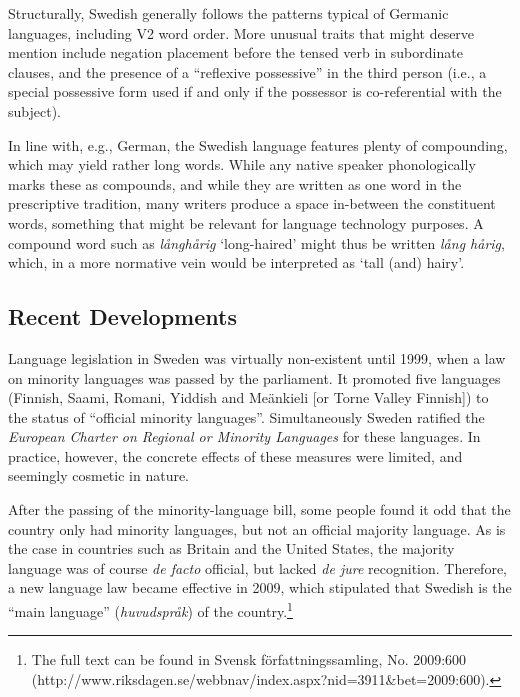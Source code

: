 \begin{multicols}{2}
Structurally, Swedish generally follows the patterns typical of
Germanic languages, including V2 word order. More unusual traits that
might deserve mention include negation placement before the tensed
verb in subordinate clauses, and the presence of a ``reflexive
possessive'' in the third person (i.e., a special possessive form used
if and only if the possessor is co-referential with the subject).


In line with, e.g., German, the Swedish language features plenty of
compounding, which may yield rather long words. While any native
speaker phonologically marks these as compounds, and while they are
written as one word in the prescriptive tradition, many writers
produce a space in-between the constituent words, something that might
be relevant for language technology purposes. A compound word such as
\textit{långhårig} `long-haired' might thus be written \textit{lång
  hårig}, which, in a more normative vein would be interpreted as
`tall (and) hairy'.

\subsection{Recent Developments}

Language legislation in Sweden was virtually non-existent until 1999,
when a law on minority languages was passed by the parliament. It
promoted five languages (Finnish, Saami, Romani, Yiddish and Meänkieli
[or Torne Valley Finnish]) to the status of ``official minority
languages''. Simultaneously Sweden ratified the \textit{European
  Charter on Regional or Minority Languages} for these languages. In
practice, however, the concrete effects of these measures were
limited, and seemingly cosmetic in nature.

After the passing of the minority-language bill, some people found it
odd that the country only had minority languages, but not an official
majority language. As is the case in countries such as Britain and the
United States, the majority language was of course \textit{de facto}
official, but lacked \textit{de jure} recognition. Therefore, a new
language law became effective in 2009, which stipulated that Swedish
is the ``main language'' (\textit{huvudspråk}) of the
country.\footnote{The full text can be found in Svensk
  författningssamling, No. 2009:600
  \\(http://www.riksdagen.se/webbnav/index.aspx?nid=3911\&bet=2009:600).}


\end{multicols}
